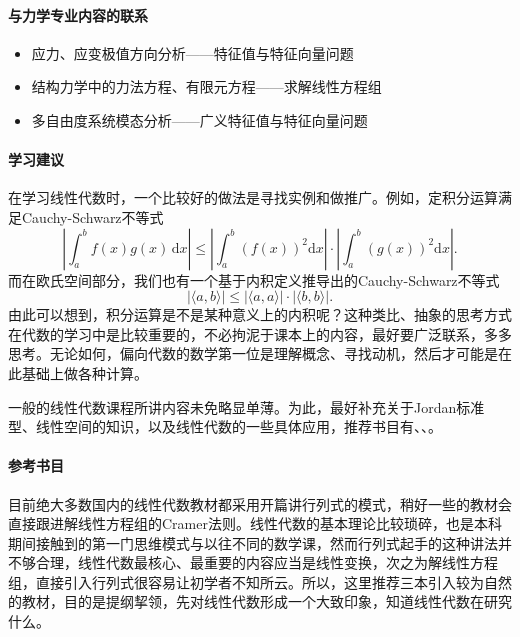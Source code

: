 \paragraph{与力学专业内容的联系}

\begin{itemize}
    \item 应力、应变极值方向分析——特征值与特征向量问题

    \item 结构力学中的力法方程、有限元方程——求解线性方程组

    \item 多自由度系统模态分析——广义特征值与特征向量问题
\end{itemize}

\paragraph{学习建议}

在学习线性代数时，一个比较好的做法是寻找实例和做推广。例如，定积分运算满足Cauchy-Schwarz不等式
\[
    \left|\int_{a}^{b}f(x)g(x)\,\mathrm{d}x\right|\leqslant\left|\int_{a}^{b}(f(x))^2\mathrm{d}x\right|\cdot \left|\int_{a}^{b}(g(x))^2\mathrm{d}x\right|
    .\]
而在欧氏空间部分，我们也有一个基于内积定义推导出的Cauchy-Schwarz不等式
\[
    \left|\langle a,b\rangle\right|\leqslant\left|\langle a,a\rangle\right| \cdot \left|\langle b,b\rangle\right|
    .\]
由此可以想到，积分运算是不是某种意义上的内积呢？这种类比、抽象的思考方式在代数的学习中是比较重要的，不必拘泥于课本上的内容，最好要广泛联系，多多思考。无论如何，偏向代数的数学第一位是理解概念、寻找动机，然后才可能是在此基础上做各种计算。

一般的线性代数课程所讲内容未免略显单薄。为此，最好补充关于Jordan标准型、线性空间的知识，以及线性代数的一些具体应用，推荐书目有\textcite[普通高中课程标准实验教科书\ 数学\ 选修4-2\ A版\ 矩阵与变换]{矩阵与变换}、\textcite[线性代数高级教程——矩阵理论及应用]{线性代数高级教程}、\textcite[线性代数应该这样学]{阿克斯勒杜现昆2016线性代数应该这样学}。

\paragraph{参考书目}

目前绝大多数国内的线性代数教材都采用开篇讲行列式的模式，稍好一些的教材会直接跟进解线性方程组的Cramer法则。线性代数的基本理论比较琐碎，也是本科期间接触到的第一门思维模式与以往不同的数学课，然而行列式起手的这种讲法并不够合理，线性代数最核心、最重要的内容应当是线性变换，次之为解线性方程组，直接引入行列式很容易让初学者不知所云。所以，这里推荐三本引入较为自然的教材，目的是提纲挈领，先对线性代数形成一个大致印象，知道线性代数在研究什么。

